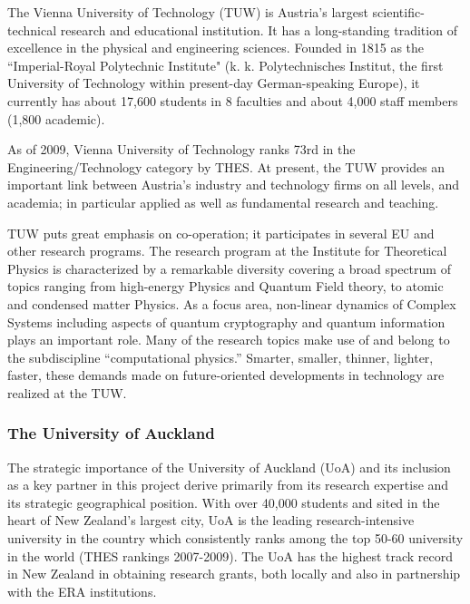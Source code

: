 \documentclass[12pt]{article}
\begin{document}
The Vienna University of Technology (TUW) is Austria's largest scientific-technical research and educational institution.
It has a long-standing tradition of excellence in the physical and
engineering sciences.
Founded in 1815 as the ``Imperial-Royal Polytechnic Institute" (k. k. Polytechnisches Institut,  the first University of Technology within present-day German-speaking Europe), it currently has about 17,600 students
in 8 faculties and about 4,000 staff members (1,800 academic).

As of 2009, Vienna University of Technology ranks  73rd in the Engineering/Technology category by THES.
At present, the TUW provides an important link between Austria's
industry and technology firms on all levels, and academia;
in particular applied as well as fundamental research and teaching.

TUW puts great emphasis on co-operation; it  participates in several EU and other research programs.
The research program at the Institute for Theoretical Physics is characterized by a remarkable diversity
covering a broad spectrum of topics ranging from high-energy Physics and Quantum Field
theory, to atomic and condensed matter Physics. As a focus area,
non-linear dynamics of Complex Systems including aspects
of quantum cryptography and quantum information plays an important role.
Many of the research topics make use of and
belong to the subdiscipline ``computational physics.'' Smarter, smaller, thinner, lighter, faster, these demands made on future-oriented developments in technology are realized at the TUW.




\subsubsection{The University of Auckland}


The strategic importance of the University of Auckland (UoA) and its inclusion
as a key partner in this project derive primarily from its research expertise
and its strategic geographical position. With over 40,000 students and sited in the heart of New Zealand's largest city, UoA is the leading research-intensive university in the country which consistently ranks among the top
50-60 university in the world (THES rankings 2007-2009). The UoA has the highest track record in New Zealand in obtaining research grants, both locally and also in partnership with the  ERA institutions.
\end{document}
